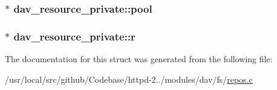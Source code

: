 \subsubsection[{\texorpdfstring{pool}{pool}}]{$\ast$ dav\+\_\+resource\+\_\+private\+::pool}\hypertarget{structdav__resource__private_ad180911d49f61626aef32667f087fa33}{}\label{structdav__resource__private_ad180911d49f61626aef32667f087fa33}
\subsubsection[{\texorpdfstring{r}{r}}]{$\ast$ dav\+\_\+resource\+\_\+private\+::r}\hypertarget{structdav__resource__private_aa89e0e2a065d4506efb4720d7bb6c203}{}\label{structdav__resource__private_aa89e0e2a065d4506efb4720d7bb6c203}


The documentation for this struct was generated from the following file\+:\begin{DoxyCompactItemize}
\item 
/usr/local/src/github/\+Codebase/httpd-\/2../modules/dav/fs/\hyperlink{repos_8c}{repos.\+c}\end{DoxyCompactItemize}
